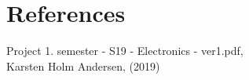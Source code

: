 \section{References}


\begin{thebibliography}{9}
Project 1. semester - S19 - Electronics - ver1.pdf, \\
Karsten Holm Andersen, (2019)

 

\end{thebibliography}